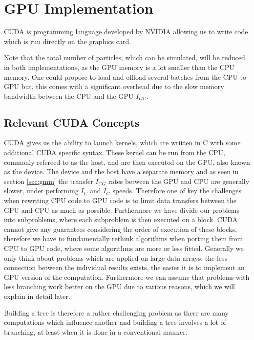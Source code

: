 \documentclass[]{article}
\begin{document}
\newpage
\section{GPU Implementation}\label{sec:gpuimpl}

CUDA is programming language developed by NVIDIA allowing us to write code which is run directly on the graphics card.

Note that the total number of particles, which can be simulated, will be reduced in both implementations, as the GPU memory is a lot smaller than the CPU memory. One could propose to load and offload several batches from the CPU to GPU but, this comes with a significant overhead due to the slow memory bandwidth between the CPU and the GPU $I_{GC}$.


\subsection{Relevant CUDA Concepts}

CUDA gives us the ability to launch kernels, which are written in C with some additional CUDA specific syntax. These kernel can be run from the CPU, commonly refereed to as the host, and are then executed on the GPU, also known as the device. The device and the host have a separate memory and as seen in section \ref{sec:gmm} the transfer $I_{CG}$ rates between the GPU and CPU are generally slower, under performing $I_{C}$ and $I_G$ speeds. Therefore one of key the challenges when rewriting CPU code to GPU code is to limit data transfers between the GPU and CPU as much as possible. Furthermore we have divide our problems into subproblems, where each subproblem is then executed on a block. CUDA cannot give any guarantees considering the order of execution of these blocks, therefore we have to fundamentally rethink algorithms when porting them from CPU to GPU code, where some algorithms are more or less fitted. Generally we only think about problems which are applied on large data arrays, the less connection between the individual results exists, the easier it is to implement an GPU version of the computation. Furthermore we can assume that problems with less branching work better on the GPU due to various reasons, which we will explain in detail later. 

Building a tree is therefore a rather challenging problem as there are many computations which influence another and building a tree involves a lot of branching, at least when it is done in a conventional manner. 
\end{document}

